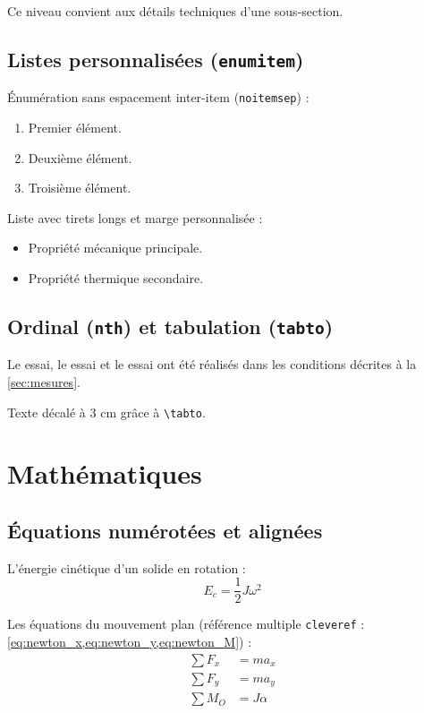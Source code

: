 \documentclass{poly}
\begin{document}
Ce niveau convient aux détails techniques d'une sous-section.

\subsection{Listes personnalisées (\texttt{enumitem})}

Énumération sans espacement inter-item (\texttt{noitemsep}) :
\begin{enumerate}[label=\arabic*., leftmargin=*, noitemsep]
    \item Premier élément.
    \item Deuxième élément.
    \item Troisième élément.
\end{enumerate}

Liste avec tirets longs et marge personnalisée :
\begin{itemize}[label=\textemdash, leftmargin=2em, itemsep=2pt]
    \item Propriété mécanique principale.
    \item Propriété thermique secondaire.
\end{itemize}

\subsection{Ordinal (\texttt{nth}) et tabulation (\texttt{tabto})}

Le  essai, le  essai et le  essai ont été réalisés
dans les conditions décrites à la \cref{sec:mesures}.

\tabto{3cm}Texte décalé à 3 cm grâce à \texttt{\textbackslash tabto}.

\section{Mathématiques}\label{sec:maths}

\subsection{Équations numérotées et alignées}

L'énergie cinétique d'un solide en rotation :
\begin{equation}
    E_c = \frac{1}{2} J \omega^2
    \label{eq:ecinrot}
\end{equation}

Les équations du mouvement plan (référence multiple
\texttt{cleveref} : \cref{eq:newton_x,eq:newton_y,eq:newton_M}) :
\begin{align}
    \sum F_x &= m a_x  \label{eq:newton_x}\\
    \sum F_y &= m a_y  \label{eq:newton_y}\\
    \sum M_O &= J\alpha \label{eq:newton_M}
\end{align}
\end{document}
